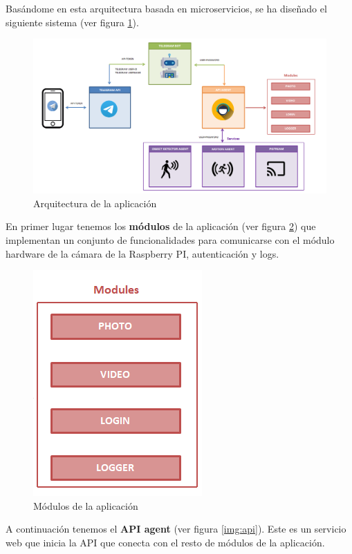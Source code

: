 Basándome en esta arquitectura basada en microservicios, se ha diseñado el siguiente sistema (ver figura \ref{img:arquitectura}).

\newpage

\begin{figure}[h]
	\centering
	\includegraphics[scale=0.4]{images/23}
	\caption{Arquitectura de la aplicación}
	\label{img:arquitectura}
\end{figure}

En primer lugar tenemos los \textbf{módulos} de la aplicación (ver figura \ref{img:modulos}) que implementan un conjunto de funcionalidades para comunicarse con el módulo hardware de la cámara de la Raspberry PI, autenticación y logs.

\begin{figure}[h]
	\centering
	\includegraphics[scale=0.4]{images/24}
	\caption{Módulos de la aplicación}
	\label{img:modulos}
\end{figure}

A continuación tenemos el \textbf{API agent} (ver figura \ref{img:api}). Este es un servicio web que inicia la API que conecta con el resto de módulos de la aplicación.

